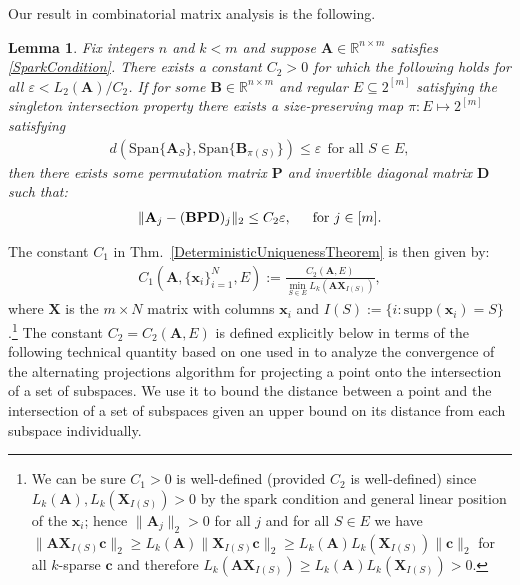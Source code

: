 \documentclass[9pt,twocolumn]{pnas-new}
\newtheorem{lemma}{Lemma}
\begin{document}

Our result in combinatorial matrix analysis is the following.

\begin{lemma}\label{MainLemma}
Fix integers $n$ and $k < m$ and suppose $\mathbf{A} \in \mathbb{R}^{n \times m}$ satisfies \eqref{SparkCondition}. There exists a constant $C_2 > 0$ for which the following holds for all $\varepsilon < L_2(\mathbf{A}) / C_2$. If for some  $\mathbf{B} \in \mathbb{R}^{n \times m}$ and regular $E \subseteq2^{[m]}$ satisfying the singleton intersection property there exists a size-preserving map $\pi: E \mapsto 2^{[m]}$ satisfying
\begin{align}\label{GapUpperBound}
d(\text{Span}\{\mathbf{A}_{S}\}, \text{Span}\{\mathbf{B}_{\pi(S)}\}) \leq \varepsilon \ \ \text{for all $S \in E$},
\end{align}
%
then there exists some permutation matrix $\mathbf{P}$ and invertible diagonal matrix $\mathbf{D}$ such that:
\begin{align}\label{MainLemmaBPD}
\|\mathbf{A}_j - (\mathbf{BPD})_j\|_2 \leq C_2 \varepsilon, \indent \text{for } j \in [m].
\end{align}
\end{lemma}

The constant $C_1$ in Thm.~\ref{DeterministicUniquenessTheorem} is then given by:
\begin{align}
C_1(\mathbf{A}, \{\mathbf{x}_i\}_{i=1}^N, E) := \frac{ C_2(\mathbf{A}, E) } { \min_{S \in E} L_k(\mathbf{AX}_{I(S)}) },
\end{align}
%
where $\mathbf{X}$ is the $m \times N$ matrix with columns $\mathbf{x}_i$ and $I(S) := \{i : \text{supp}(\mathbf{x}_i) = S\}$.\footnote{We can be sure $C_1 > 0$ is well-defined (provided $C_2$ is well-defined) since $L_k(\mathbf{A}), L_k(\mathbf{X}_{I(S)}) > 0$ by the spark condition and general linear position of the $\mathbf{x}_i$; hence $\|\mathbf{A}_j\|_2 > 0$ for all $j$ and for all $S \in E$ we have $\|\mathbf{AX}_{I(S)}\mathbf{c}\|_2 \geq L_k(\mathbf{A})\|\mathbf{X}_{I(S)}\mathbf{c}\|_2 \geq L_k(\mathbf{A}) L_k(\mathbf{X}_{I(S)})\|\mathbf{c}\|_2$ for all $k$-sparse $\mathbf{c}$ and therefore $L_k(\mathbf{AX}_{I(S)}) \geq L_k(\mathbf{A}) L_k(\mathbf{X}_{I(S)}) > 0$.} The constant $C_2 = C_2(\mathbf{A}, E)$ is defined explicitly below in terms of the following technical quantity based on one used in \cite{Deutsch12} to analyze the convergence of the alternating projections algorithm for projecting a point onto the intersection of a set of subspaces. We use it to bound the distance between a point and the intersection of a set of subspaces given an upper bound on its distance from each subspace individually.
\end{document}

